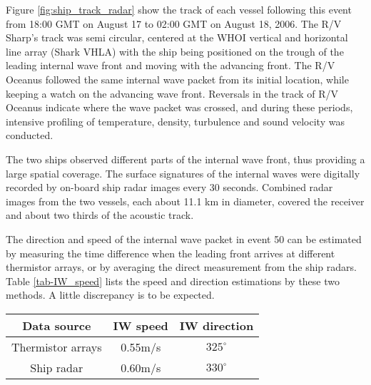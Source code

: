 Figure \ref{fig:ship_track_radar} show the track of each vessel following this
event from 18:00 GMT on August 17 to 02:00 GMT on August 18, 2006.
The R/V Sharp's track was semi circular, centered at the WHOI
vertical and horizontal line array (Shark VHLA) with the ship being
positioned on the trough of the leading internal wave front and moving with
the advancing front. The R/V Oceanus followed the same internal wave packet
from its initial location, while keeping a watch on the advancing
wave front. Reversals in the track of R/V Oceanus indicate where the
wave packet was crossed, and during these periods, intensive
profiling of temperature, density, turbulence and sound velocity was
conducted.

The two ships observed different parts of the internal wave front, thus
providing a large spatial coverage. The surface signatures of the
internal waves were digitally recorded by on-board ship radar images every 30
seconds. Combined radar images from the two vessels, each about 11.1
km in diameter, covered the receiver and about two thirds of the
acoustic track. 

The direction and speed of the internal wave packet in event 50 can be estimated by measuring the time difference when the leading front arrives at different thermistor arrays, or by averaging the direct measurement from the ship radars. Table \ref{tab-IW_speed} lists the speed and direction estimations by these two methods. A little discrepancy is to be expected.
\begin{table*}[hc]
\caption{ Direction and speed of the internal wave packet in event 50
\label{tab-IW_speed}}
\begin{center} 
\begin{tabular}{ | c|c | c |}
\hline
Data source & IW speed & IW direction\\
\hline
 Thermistor arrays & 0.55m/s & $325^\circ$ \\
 \hline
 Ship radar & 0.60m/s & $330^\circ$\\
 \hline
 
 \hline
 
\end{tabular} 
\end{center}
\end{table*}
%
%

